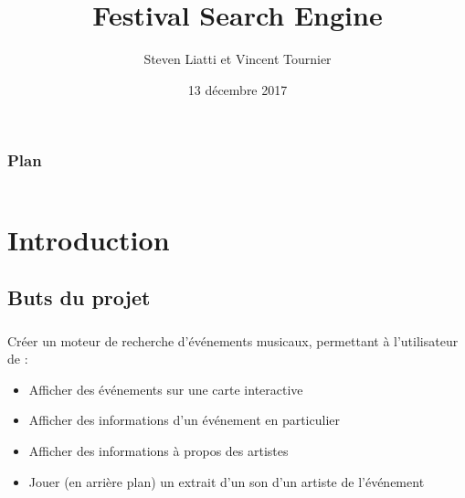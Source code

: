 \documentclass[10pt]{beamer}
\begin{document}

\title{Festival Search Engine}
\author{Steven Liatti et Vincent Tournier}
\date{13 décembre 2017}

\begin{frame}
\titlepage
\end{frame}

\begin{frame}
	\setcounter{tocdepth}{2}
    \frametitle{Plan}
    \begin{columns}[t]
        \begin{column}{.5\textwidth}
            \tableofcontents[sections={1-2}]
        \end{column}
        \begin{column}{.5\textwidth}
            \tableofcontents[sections={3-4}]
        \end{column}
    \end{columns}
\end{frame}

\section{Introduction}
\subsection{Buts du projet}
\begin{frame}
	\frametitle{\secname}
	\framesubtitle{\subsecname}
	Créer un moteur de recherche d'événements musicaux, permettant à l'utilisateur de :
	\begin{itemize}
		\item Afficher des événements sur une carte interactive
		\item Afficher des informations d'un événement en particulier
		\item Afficher des informations à propos des artistes
		\item Jouer (en arrière plan) un extrait d'un son d'un artiste de l'événement
	\end{itemize}
\end{frame}
\end{document}

